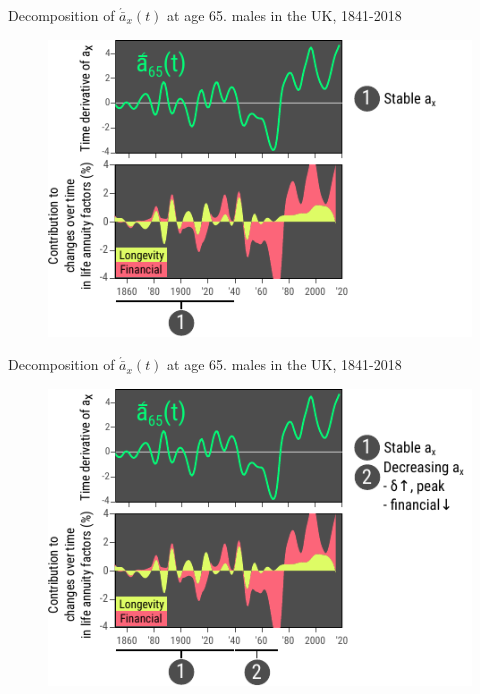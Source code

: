 \documentclass[10pt]{beamer}
\begin{document}
\begin{frame}{Decomposition of $\acute{\bar{a}}_x(t)$ at age 65. males in the UK, 1841-2018}
\begin{figure}
	\centering
	\hspace*{-0.9cm}
	\includegraphics[scale=1.45] {Fig403.pdf}
\end{figure}
\end{frame}

\begin{frame}{Decomposition of $\acute{\bar{a}}_x(t)$ at age 65. males in the UK, 1841-2018}
\begin{figure}
	\centering
	\hspace*{-0.9cm}
	\includegraphics[scale=1.45] {Fig402.pdf}
\end{figure}
\end{frame}
\end{document}
